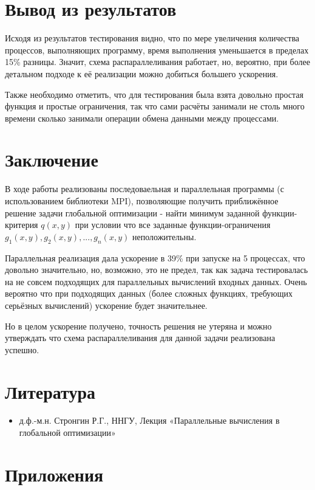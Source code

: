 \documentclass[12pt]{article}
\begin{document}
\section{Вывод из результатов}
Исходя из результатов тестирования видно, что по мере увеличения количества процессов, выполняющих программу, время выполнения уменьшается в пределах 15\% разницы. Значит, схема распараллеливания работает, но, вероятно, при более детальном подходе к её реализации можно добиться большего ускорения.

Также необходимо отметить, что для тестирования была взята довольно простая функция и простые ограничения, так что сами расчёты занимали не столь много времени сколько занимали операции обмена данными между процессами.

\section{Заключение}
В ходе работы реализованы последоваельная и параллельная программы (с использованием библиотеки MPI), позволяющие получить приближённое решение задачи глобальной оптимизации - найти минимум заданной функции-критерия $q(x, y)$ при условии что все заданные функции-ограничения \textit{$g_1(x, y), g_2(x, y), ..., g_n(x, y)$} неположительны.

Параллельная реализация дала ускорение в 39\% при запуске на 5 процессах, что довольно значительно, но, возможно, это не предел, так как задача тестировалась на не совсем подходящих для параллельных вычислений входных данных. Очень вероятно что при подходящих данных (более сложных функциях, требующих серьёзных вычислений) ускорение будет значительнее.

Но в целом ускорение получено, точность решения не утеряна и можно утверждать что схема распараллеливания для данной задачи реализована успешно.

\section{Литература}
\begin{itemize}
    \item д.ф.-м.н. Стронгин Р.Г., ННГУ, Лекция «Параллельные вычисления в глобальной оптимизации»
\end{itemize}

\section{Приложения}
\end{document}
